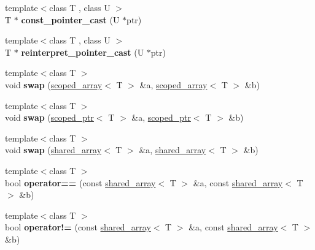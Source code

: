 \begin{DoxyCompactItemize}
\item 
\hypertarget{namespaceboost_aa96f226ac02371b5bf7e947938e94d50}{{\footnotesize template$<$class T , class U $>$ }\\T $\ast$ {\bfseries const\+\_\+pointer\+\_\+cast} (U $\ast$ptr)}\label{namespaceboost_aa96f226ac02371b5bf7e947938e94d50}

\item 
\hypertarget{namespaceboost_ad794177d673897551279b4e8ed45c80a}{{\footnotesize template$<$class T , class U $>$ }\\T $\ast$ {\bfseries reinterpret\+\_\+pointer\+\_\+cast} (U $\ast$ptr)}\label{namespaceboost_ad794177d673897551279b4e8ed45c80a}

\item 
\hypertarget{namespaceboost_a72d3f808fd494f5be748b961472fc468}{{\footnotesize template$<$class T $>$ }\\void {\bfseries swap} (\hyperlink{classboost_1_1scoped__array}{scoped\+\_\+array}$<$ T $>$ \&a, \hyperlink{classboost_1_1scoped__array}{scoped\+\_\+array}$<$ T $>$ \&b)}\label{namespaceboost_a72d3f808fd494f5be748b961472fc468}

\item 
\hypertarget{namespaceboost_a7539e2295916b5fe4d0356e5bae5a74e}{{\footnotesize template$<$class T $>$ }\\void {\bfseries swap} (\hyperlink{classboost_1_1scoped__ptr}{scoped\+\_\+ptr}$<$ T $>$ \&a, \hyperlink{classboost_1_1scoped__ptr}{scoped\+\_\+ptr}$<$ T $>$ \&b)}\label{namespaceboost_a7539e2295916b5fe4d0356e5bae5a74e}

\item 
\hypertarget{namespaceboost_a7fe2cc98711adb8a5631d1bc49f35a68}{{\footnotesize template$<$class T $>$ }\\void {\bfseries swap} (\hyperlink{classboost_1_1shared__array}{shared\+\_\+array}$<$ T $>$ \&a, \hyperlink{classboost_1_1shared__array}{shared\+\_\+array}$<$ T $>$ \&b)}\label{namespaceboost_a7fe2cc98711adb8a5631d1bc49f35a68}

\item 
\hypertarget{namespaceboost_ae67db875658d2ec32a4d3db8816a3c17}{{\footnotesize template$<$class T $>$ }\\bool {\bfseries operator==} (const \hyperlink{classboost_1_1shared__array}{shared\+\_\+array}$<$ T $>$ \&a, const \hyperlink{classboost_1_1shared__array}{shared\+\_\+array}$<$ T $>$ \&b)}\label{namespaceboost_ae67db875658d2ec32a4d3db8816a3c17}

\item 
\hypertarget{namespaceboost_a2c0ea0f486e1e8872d0293eb1b8557d1}{{\footnotesize template$<$class T $>$ }\\bool {\bfseries operator!=} (const \hyperlink{classboost_1_1shared__array}{shared\+\_\+array}$<$ T $>$ \&a, const \hyperlink{classboost_1_1shared__array}{shared\+\_\+array}$<$ T $>$ \&b)}\label{namespaceboost_a2c0ea0f486e1e8872d0293eb1b8557d1}


\end{DoxyCompactItemize}
